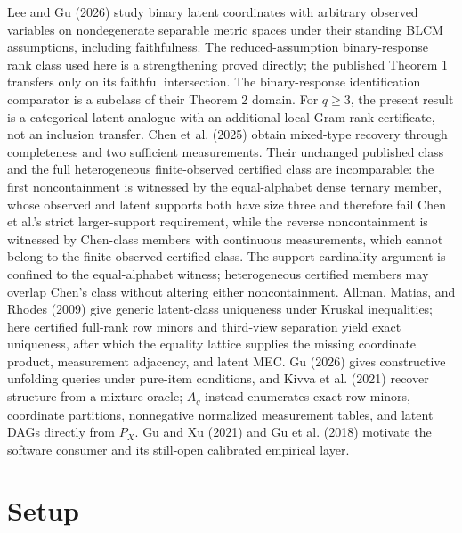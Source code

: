 \documentclass{article}
\begin{document}
Lee and Gu (2026) study binary latent coordinates with arbitrary observed variables on nondegenerate separable metric spaces under their standing BLCM assumptions, including faithfulness.  The reduced-assumption binary-response rank class used here is a strengthening proved directly; the published Theorem 1 transfers only on its faithful intersection.  The binary-response identification comparator is a subclass of their Theorem 2 domain.  For \(q\ge3\), the present result is a categorical-latent analogue with an additional local Gram-rank certificate, not an inclusion transfer.  Chen et al. (2025) obtain mixed-type recovery through completeness and two sufficient measurements.  Their unchanged published class and the full heterogeneous finite-observed certified class are incomparable: the first noncontainment is witnessed by the equal-alphabet dense ternary member, whose observed and latent supports both have size three and therefore fail Chen et al.'s strict larger-support requirement, while the reverse noncontainment is witnessed by Chen-class members with continuous measurements, which cannot belong to the finite-observed certified class.  The support-cardinality argument is confined to the equal-alphabet witness; heterogeneous certified members may overlap Chen's class without altering either noncontainment.  Allman, Matias, and Rhodes (2009) give generic latent-class uniqueness under Kruskal inequalities; here certified full-rank row minors and third-view separation yield exact uniqueness, after which the equality lattice supplies the missing coordinate product, measurement adjacency, and latent MEC.  Gu (2026) gives constructive unfolding queries under pure-item conditions, and Kivva et al. (2021) recover structure from a mixture oracle; \(A_q\) instead enumerates exact row minors, coordinate partitions, nonnegative normalized measurement tables, and latent DAGs directly from \(P_X\).  Gu and Xu (2021) and Gu et al. (2018) motivate the software consumer and its still-open calibrated empirical layer.

\section{Setup}
\end{document}
